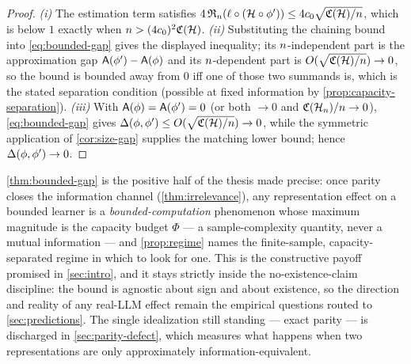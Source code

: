 \begin{proof}
\emph{(i)} The estimation term satisfies
$4\,\mathfrak{R}_n(\ell\circ(\mathcal{H}\circ\phi'))\le 4c_0\sqrt{\mathfrak{C}(\mathcal{H})/n}$,
which is below $1$ exactly when $n>(4c_0)^2\mathfrak{C}(\mathcal{H})$.
\emph{(ii)} Substituting the chaining bound into \eqref{eq:bounded-gap} gives the
displayed inequality; its $n$-independent part is the approximation gap
$\mathsf{A}(\phi')-\mathsf{A}(\phi)$ and its $n$-dependent part is
$O(\sqrt{\mathfrak{C}(\mathcal{H})/n})\to 0$, so the bound is bounded away from
$0$ iff one of those two summands is, which is the stated separation condition
(possible at fixed information by \cref{prop:capacity-separation}).
\emph{(iii)} With $\mathsf{A}(\phi)=\mathsf{A}(\phi')=0$ (or both $\to 0$ and
$\mathfrak{C}(\mathcal{H}_n)/n\to 0$), \eqref{eq:bounded-gap} gives
$\Delta(\phi,\phi')\le O(\sqrt{\mathfrak{C}(\mathcal{H})/n})\to 0$, while the
symmetric application of \cref{cor:size-gap} supplies the matching lower bound;
hence $\Delta(\phi,\phi')\to 0$.
\end{proof}

\begin{remark}
\label{rem:bounded-reading}
\cref{thm:bounded-gap} is the positive half of the thesis made precise: once
parity closes the information channel (\cref{thm:irrelevance}), any
representation effect on a bounded learner is a \emph{bounded-computation}
phenomenon whose maximum magnitude is the capacity budget $\Phi$ --- a
sample-complexity quantity, never a mutual information --- and
\cref{prop:regime} names the finite-sample, capacity-separated regime in which to
look for one. This is the constructive payoff promised in \cref{sec:intro}, and
it stays strictly inside the no-existence-claim discipline: the bound is agnostic about sign and about
existence, so the direction and reality of any real-LLM effect remain the
empirical questions routed to \cref{sec:predictions}. The single idealization
still standing --- exact parity --- is discharged in \cref{sec:parity-defect},
which measures what happens when two representations are only approximately
information-equivalent.
\end{remark}
